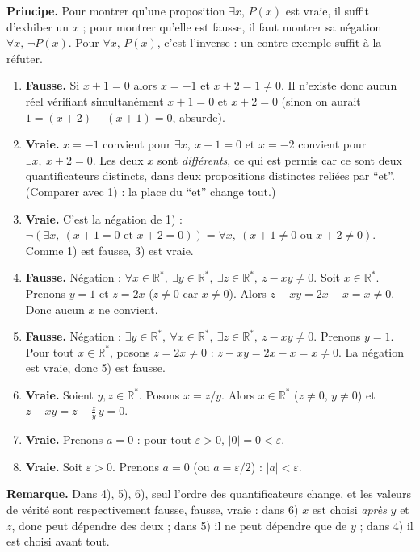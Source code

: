 \documentclass[11pt,a4paper]{article}
\newcommand{\R}{\mathbb{R}}\newcommand{\N}{\mathbb{N}}\newcommand{\Z}{\mathbb{Z}}
\newcommand{\veps}{\varepsilon}
\newcommand{\rem}[1]{\par\smallskip\noindent\textbf{Remarque.} #1}
\begin{document}
	\begin{corrige}
		\textbf{Principe.} Pour montrer qu'une proposition $\exists x,\,P(x)$ est vraie, il suffit d'exhiber un $x$ ; pour montrer qu'elle est fausse, il faut montrer sa négation $\forall x,\,\neg P(x)$. Pour $\forall x,\,P(x)$, c'est l'inverse : un contre-exemple suffit à la réfuter.
		\begin{enumerate}
			\item \textbf{Fausse.} Si $x+1=0$ alors $x=-1$ et $x+2=1\neq0$. Il n'existe donc aucun réel vérifiant simultanément $x+1=0$ et $x+2=0$ (sinon on aurait $1=(x+2)-(x+1)=0$, absurde).
			\item \textbf{Vraie.} $x=-1$ convient pour $\exists x,\ x+1=0$ et $x=-2$ convient pour $\exists x,\ x+2=0$. Les deux $x$ sont \emph{différents}, ce qui est permis car ce sont deux quantificateurs distincts, dans deux propositions distinctes reliées par ``et''. (Comparer avec 1) : la place du ``et'' change tout.)
			\item \textbf{Vraie.} C'est la négation de 1) : $\neg(\exists x,\ (x+1=0 \text{ et } x+2=0))=\forall x,\ (x+1\neq0 \text{ ou } x+2\neq0)$. Comme 1) est fausse, 3) est vraie.
			\item \textbf{Fausse.} Négation : $\forall x\in\R^*,\ \exists y\in\R^*,\ \exists z\in\R^*,\ z-xy\neq0$. Soit $x\in\R^*$. Prenons $y=1$ et $z=2x$ ($z\neq0$ car $x\neq0$). Alors $z-xy=2x-x=x\neq0$. Donc aucun $x$ ne convient.
			\item \textbf{Fausse.} Négation : $\exists y\in\R^*,\ \forall x\in\R^*,\ \exists z\in\R^*,\ z-xy\neq0$. Prenons $y=1$. Pour tout $x\in\R^*$, posons $z=2x\neq0$ : $z-xy=2x-x=x\neq0$. La négation est vraie, donc 5) est fausse.
			\item \textbf{Vraie.} Soient $y,z\in\R^*$. Posons $x=z/y$. Alors $x\in\R^*$ ($z\neq0$, $y\neq0$) et $z-xy=z-\frac zy\,y=0$.
			\item \textbf{Vraie.} Prenons $a=0$ : pour tout $\veps>0$, $|0|=0<\veps$.
			\item \textbf{Vraie.} Soit $\veps>0$. Prenons $a=0$ (ou $a=\veps/2$) : $|a|<\veps$.
		\end{enumerate}
		\rem{Dans 4), 5), 6), seul l'ordre des quantificateurs change, et les valeurs de vérité sont respectivement fausse, fausse, vraie : dans 6) $x$ est choisi \emph{après} $y$ et $z$, donc peut dépendre des deux ; dans 5) il ne peut dépendre que de $y$ ; dans 4) il est choisi avant tout.}
	\end{corrige}
	
\end{document}
